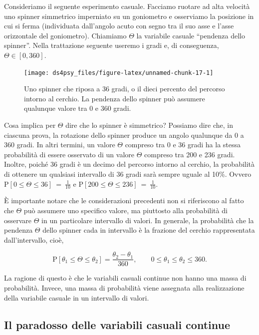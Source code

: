 \documentclass[
  11pt,
]{krantz}
\theoremstyle{definition}
\theoremstyle{definition}
\theoremstyle{definition}
\theoremstyle{definition}
\theoremstyle{remark}
\begin{document}
Consideriamo il seguente esperimento casuale. Facciamo ruotare ad alta velocità uno spinner simmetrico imperniato su un goniometro e osserviamo la posizione in cui si ferma (individuata dall'angolo acuto con segno tra il suo asse e l'asse orizzontale del goniometro). Chiamiamo \(\Theta\) la variabile casuale ``pendenza dello spinner''. Nella trattazione seguente useremo i gradi e, di conseguenza, \(\Theta \in [0, 360]\).

\begin{figure}[h]

{\centering \texttt{[image: ds4psy\_files/figure-latex/unnamed-chunk-17-1]} 

}

\caption{Uno spinner che riposa a 36 gradi, o il dieci percento del percorso intorno al cerchio. La pendenza dello spinner può assumere qualunque valore tra 0 e 360 gradi.}\label{fig:unnamed-chunk-17}
\end{figure}

Cosa implica per \(\Theta\) dire che lo spinner è simmetrico? Possiamo dire che, in ciascuna prova, la rotazione dello spinner produce un angolo qualunque da 0 a 360 gradi. In altri termini, un valore \(\Theta\) compreso tra 0 e 36 gradi ha la stessa probabilità di essere osservato di un valore \(\Theta\) compreso tra 200 e 236 gradi. Inoltre, poiché 36 gradi è un decimo del percorso intorno al cerchio, la probabilità di ottenere un qualsiasi intervallo di 36 gradi sarà sempre uguale al 10\%. Ovvero \(\mbox{P}[0 \leq \Theta \leq 36] \ = \ \frac{1}{10}\) e \(\mbox{P}[200 \leq \Theta \leq 236] \ = \ \frac{1}{10}\).

È importante notare che le considerazioni precedenti non si riferiscono al fatto che \(\Theta\) può assumere uno specifico valore, ma piuttosto alla probabilità di osservare \(\Theta\) in un particolare intervallo di valori. In generale, la probabilità che la pendenza \(\Theta\) dello spinner cada in intervallo è la frazione del cerchio rappresentata dall'intervallo, cioè,

\[
\mbox{P}[\theta_1 \leq \Theta \leq \theta_2] = \frac{\theta_2 - \theta_1}{360}, \qquad 0 \leq \theta_1 \leq \theta_2 \leq 360.
\]

La ragione di questo è che le variabili casuali continue non hanno una massa di probabilità. Invece, una massa di probabilità viene assegnata alla realizzazione della variabile casuale in un intervallo di valori.

\hypertarget{il-paradosso-delle-variabili-casuali-continue}{%
\subsection{Il paradosso delle variabili casuali continue}\label{il-paradosso-delle-variabili-casuali-continue}}
\end{document}
